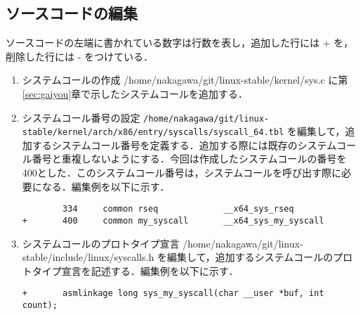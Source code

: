 \documentclass[12pt]{jsarticle}
\begin{document}
\subsection{ソースコードの編集}\label{sec:hensyuu}
ソースコードの左端に書かれている数字は行数を表し，追加した行には + を，削除した行には - をつけている．
  \begin{enumerate}
  \item システムコールの作成
    /home/nakagawa/git/linux-stable/kernel/sys.c に第\ref{sec:gaiyou}章で示したシステムコールを追加する．
  \item システムコール番号の設定
    \verb|/home/nakagawa/git/linux-stable/kernel/arch/x86/entry/syscalls/syscall_64.tbl| を編集して，追加するシステムコール番号を定義する．追加する際には既存のシステムコール番号と重複しないようにする．今回は作成したシステムコールの番号を400とした．このシステムコール番号は，システムコールを呼び出す際に必要になる．編集例を以下に示す．
\begin{verbatim}
        334     common rseq             __x64_sys_rseq
+       400     common my_syscall       __x64_sys_my_syscall
\end{verbatim}
\item システムコールのプロトタイプ宣言
  /home/nakagawa/git/linux-stable/include/linux/syscalls.h を編集して，追加するシステムコールのプロトタイプ宣言を記述する．編集例を以下に示す．
\begin{verbatim}
+       asmlinkage long sys_my_syscall(char __user *buf, int count);
\end{verbatim}
  \end{enumerate}
\end{document}

